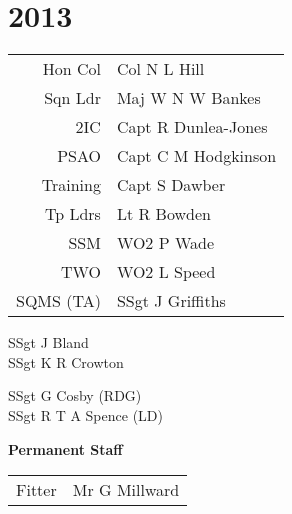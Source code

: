 \chapter*{2013}

\vspace*{20mm}

\begin{center}
  \begin{tabular}{rl}
    Hon Col & Col N L Hill \\
    Sqn Ldr & Maj W N W Bankes \\
    2IC & Capt R Dunlea-Jones \\
    PSAO & Capt C M Hodgkinson \\
    Training & Capt S Dawber \\
    Tp Ldrs & Lt R Bowden \\
    SSM & WO2 P Wade \\
    TWO & WO2 L Speed \\
    SQMS (TA) & SSgt J Griffiths \\
  \end{tabular}
\end{center}

\vspace*{5mm}

\begin{center}
  \noindent
  SSgt J Bland \\
  SSgt K R Crowton \\
\end{center}

\vspace*{10mm}

\begin{center}
  \noindent
  SSgt G Cosby (RDG) \\
  SSgt R T A Spence (LD) \\
\end{center}

\begin{center}
  \Large
  \textbf{Permanent Staff}
\end{center}

\begin{center}
  \begin{tabular}{rl}
    Fitter & Mr G Millward \\
  \end{tabular}
\end{center}
